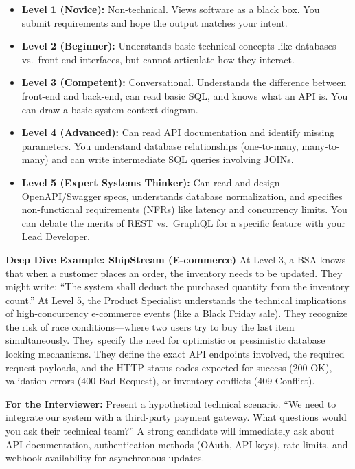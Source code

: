 \documentclass[
  11pt,
  openany,
  oneside]{book}
\providecommand{\tightlist}{%
  \setlength{\itemsep}{0pt}\setlength{\parskip}{0pt}}
\renewenvironment{quote}{\begin{customquote}}{\end{customquote}}
\begin{document}
\begin{itemize}
\tightlist
\item
  \textbf{Level 1 (Novice):} Non-technical. Views software as a black
  box. You submit requirements and hope the output matches your intent.
\item
  \textbf{Level 2 (Beginner):} Understands basic technical concepts like
  databases vs.~front-end interfaces, but cannot articulate how they
  interact.
\item
  \textbf{Level 3 (Competent):} Conversational. Understands the
  difference between front-end and back-end, can read basic SQL, and
  knows what an API is. You can draw a basic system context diagram.
\item
  \textbf{Level 4 (Advanced):} Can read API documentation and identify
  missing parameters. You understand database relationships
  (one-to-many, many-to-many) and can write intermediate SQL queries
  involving JOINs.
\item
  \textbf{Level 5 (Expert Systems Thinker):} Can read and design
  OpenAPI/Swagger specs, understands database normalization, and
  specifies non-functional requirements (NFRs) like latency and
  concurrency limits. You can debate the merits of REST vs.~GraphQL for
  a specific feature with your Lead Developer.
\end{itemize}

\textbf{Deep Dive Example: ShipStream (E-commerce)} At Level 3, a BSA
knows that when a customer places an order, the inventory needs to be
updated. They might write: ``The system shall deduct the purchased
quantity from the inventory count.'' At Level 5, the Product Specialist
understands the technical implications of high-concurrency e-commerce
events (like a Black Friday sale). They recognize the risk of race
conditions---where two users try to buy the last item simultaneously.
They specify the need for optimistic or pessimistic database locking
mechanisms. They define the exact API endpoints involved, the required
request payloads, and the HTTP status codes expected for success (200
OK), validation errors (400 Bad Request), or inventory conflicts (409
Conflict).

\begin{quote}
\textbf{For the Interviewer:} Present a hypothetical technical scenario.
``We need to integrate our system with a third-party payment gateway.
What questions would you ask their technical team?'' A strong candidate
will immediately ask about API documentation, authentication methods
(OAuth, API keys), rate limits, and webhook availability for
asynchronous updates.
\end{quote}
\end{document}
